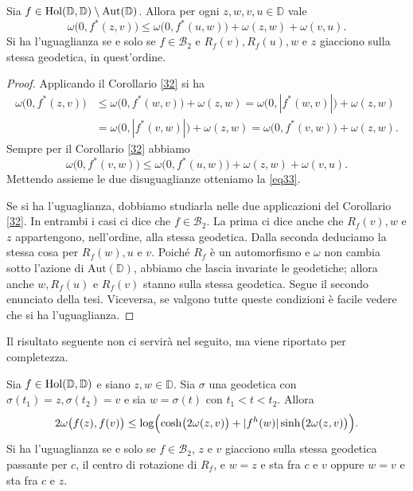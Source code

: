\begin{cor} \label{33}
  Sia $f \in \text{\normalfont{Hol}}(\mathbb{D},\mathbb{D})\setminus\text{\normalfont{Aut}}(\mathbb{D})$. Allora per ogni $z, w, v, u \in \mathbb{D}$ vale
  \begin{equation} \label{eq33}
    \omega\bigl(0, f^*(z,v)\bigr) \le \omega\bigl(0, f^*(u,w)\bigr)+\omega(z,w)+\omega(v,u).
  \end{equation}
  Si ha l'uguaglianza se e solo se $f \in \mathcal{B}_2$ e $R_f(v), R_f(u), w$ e $z$ giacciono sulla stessa geodetica, in quest'ordine.
\end{cor}
\begin{proof}
  Applicando il Corollario \ref{32} si ha
  \begin{align*}
    \omega\bigl(0,f^*(z,v)\bigr) & \le \omega\bigl(0,f^*(w,v)\bigr)+\omega(z,w) =\omega\bigl(0,|f^*(w,v)|\bigr)+\omega(z,w) \\
    & =\omega\bigl(0,|f^*(v,w)|\bigr)+\omega(z,w)=\omega\bigl(0,f^*(v,w)\bigr)+\omega(z,w).
  \end{align*}
  Sempre per il Corollario \ref{32} abbiamo
  $$\omega\bigl(0,f^*(v,w)\bigr) \le \omega\bigl(0,f^*(u,w)\bigr)+\omega(z,w)+\omega(v,u).$$
  Mettendo assieme le due disuguaglianze otteniamo la \eqref{eq33}.

  Se si ha l'uguaglianza, dobbiamo studiarla nelle due applicazioni del Corollario \ref{32}. In entrambi i casi ci dice che $f \in \mathcal{B}_2$. La prima ci dice anche che $R_f(v), w$ e $z$ appartengono, nell'ordine, alla stessa geodetica. Dalla seconda deduciamo la stessa cosa per $R_f(w), u$ e $v$. Poiché $R_f$ è un automorfismo e $\omega$ non cambia sotto l'azione di $\text{Aut}(\mathbb{D})$, abbiamo che lascia invariate le geodetiche; allora anche $w, R_f(u)$ e $R_f(v)$ stanno sulla stessa geodetica. Segue il secondo enunciato della tesi. Viceversa, se valgono tutte queste condizioni è facile vedere che si ha l'uguaglianza.
\end{proof}

Il risultato seguente non ci servirà nel seguito, ma viene riportato per completezza.

\begin{cor} \label{35}
  Sia $f \in \normalfont{\text{Hol}}(\mathbb{D},\mathbb{D})$ e siano $z, w \in \mathbb{D}$. Sia $\sigma$ una geodetica con $\sigma(t_1)=z, \sigma(t_2)=v$ e sia $w=\sigma(t)$ con $t_1<t<t_2$. Allora
  \begin{equation} \label{geod}
    2\omega\bigl(f(z),f(v)\bigr) \le \log\Bigl(\cosh\bigl(2\omega(z,v)\bigr)+|f^h(w)|\sinh\bigl(2\omega(z,v)\bigr)\Bigr).
  \end{equation}
  Si ha l'uguaglianza se e solo se $f \in \mathcal{B}_2$, $z$ e $v$ giacciono sulla stessa geodetica passante per $c$, il centro di rotazione di $R_f$, e $w=z$ e sta fra $c$ e $v$ oppure $w=v$ e sta fra $c$ e $z$.
\end{cor}

